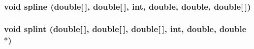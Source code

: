 \subsubsection{\setlength{\rightskip}{0pt plus 5cm}void spline (double[$\,$], double[$\,$], int, double, double, double[$\,$])}\label{utils_8c_18ab99a10fb62b5d9e6385bf253d4849}


\subsubsection{\setlength{\rightskip}{0pt plus 5cm}void splint (double[$\,$], double[$\,$], double[$\,$], int, double, double $\ast$)}\label{utils_8c_3d61c824d4b5c07a21d5c85b16ab6ccc}


